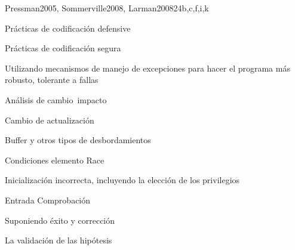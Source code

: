 \begin{syllabus}
\begin{unit}{\SESoftwareConstruction}{}{Pressman2005, Sommerville2008, Larman2008}{24}{b,c,f,i,k}
	\begin{topics}
		\item \SESoftwareConstructionTopicCoding
		\begin{subtopic}
			\item Prácticas de codificación defensive
			\item Prácticas de codificación segura
			\item Utilizando mecanismos de manejo de excepciones para hacer el programa más robusto, tolerante a fallas
		\end{subtopic}
		\item \SESoftwareConstructionTopicCodingStandards
		\item \SESoftwareConstructionTopicIntegration
		\item \SESoftwareConstructionTopicDevelopment
		\begin{subtopic} 
			\item Análisis de cambio impacto 
			\item Cambio de actualización 
		\end{subtopic}
		\item \SESoftwareConstructionTopicPotential
		\begin{subtopic} 
			\item Buffer y otros tipos de desbordamientos 
			\item Condiciones elemento Race 
			\item Inicialización incorrecta, incluyendo la elección de los privilegios 
			\item Entrada Comprobación 
			\item Suponiendo éxito y corrección 
			\item La validación de las hipótesis 
		\end{subtopic}
	\end{topics}
	\begin{learningoutcomes}
		\item \SESoftwareConstructionLODescribeTechniques[\Assessment]
		\item \SESoftwareConstructionLOBuild[\Assessment]
		\item \SESoftwareConstructionLODescribeSecure[\Assessment]
		\item \SESoftwareConstructionLOSelectAndDefined[\Assessment]
		\item \SESoftwareConstructionLOCompareAndStrategies[\Assessment]
		\item \SESoftwareConstructionLODescribeTheAnalyzing[\Assessment]
		\item \SESoftwareConstructionLODescribeTheAnalyzingChanges[\Assessment]
		\item \SESoftwareConstructionLORewrite[\Assessment]
		\item \SESoftwareConstructionLOWriteAThatNon[\Assessment]
	\end{learningoutcomes}
\end{unit}



\begin{coursebibliography}
\end{coursebibliography}

\end{syllabus}

%
